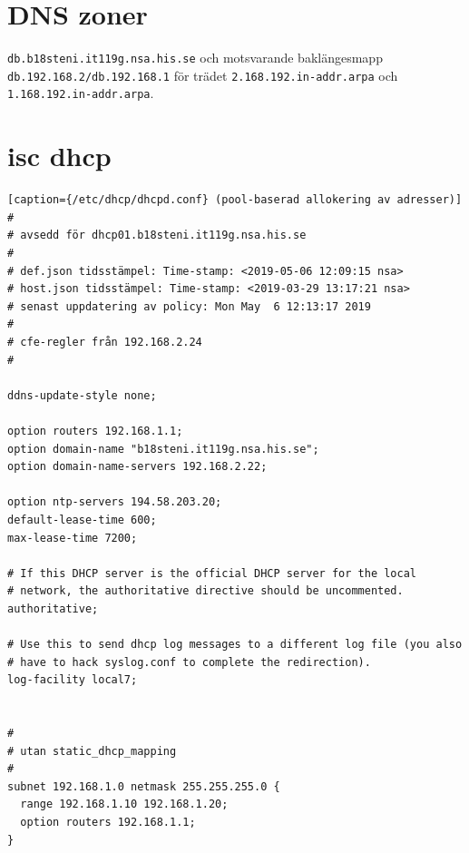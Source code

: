 \documentclass[swedish,10pt,a4paper]{article}
\begin{document}
\section{DNS zoner}\label{sec:appendix_dns_zones}

\texttt{db.b18steni.it119g.nsa.his.se} och motsvarande baklängesmapp\@
\texttt{ db.192.168.2/db.192.168.1} för trädet \texttt{2.168.192.in-addr.arpa}
och \texttt{1.168.192.in-addr.arpa}.

\section{isc dhcp}\label{sec:appendix_isc_dhcpd_config}

\begin{lstlisting}[caption={/etc/dhcp/dhcpd.conf} (pool-baserad allokering av adresser)]
#
# avsedd för dhcp01.b18steni.it119g.nsa.his.se
#
# def.json tidsstämpel: Time-stamp: <2019-05-06 12:09:15 nsa>
# host.json tidsstämpel: Time-stamp: <2019-03-29 13:17:21 nsa>
# senast uppdatering av policy: Mon May  6 12:13:17 2019
#
# cfe-regler från 192.168.2.24
#

ddns-update-style none;

option routers 192.168.1.1;
option domain-name "b18steni.it119g.nsa.his.se";
option domain-name-servers 192.168.2.22;

option ntp-servers 194.58.203.20;
default-lease-time 600;
max-lease-time 7200;

# If this DHCP server is the official DHCP server for the local
# network, the authoritative directive should be uncommented.
authoritative;

# Use this to send dhcp log messages to a different log file (you also
# have to hack syslog.conf to complete the redirection).
log-facility local7;


#
# utan static_dhcp_mapping
#
subnet 192.168.1.0 netmask 255.255.255.0 {
  range 192.168.1.10 192.168.1.20;
  option routers 192.168.1.1;
}
\end{lstlisting}
\newpage
\end{document}
